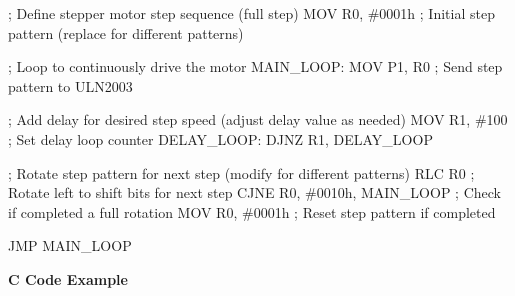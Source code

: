 \documentclass[
]{article}
\newenvironment{Shaded}{}{}
\newcommand{\NormalTok}[1]{#1}
\begin{document}
\begin{Shaded}
\begin{Highlighting}[]
\NormalTok{; Define stepper motor step sequence (full step)}
\NormalTok{MOV R0, \#0001h  ; Initial step pattern (replace for different patterns)}

\NormalTok{; Loop to continuously drive the motor}
\NormalTok{MAIN\_LOOP:}
\NormalTok{    MOV P1, R0     ; Send step pattern to ULN2003}

\NormalTok{    ; Add delay for desired step speed (adjust delay value as needed)}
\NormalTok{    MOV R1, \#100  ; Set delay loop counter}
\NormalTok{    DELAY\_LOOP:}
\NormalTok{        DJNZ R1, DELAY\_LOOP}

\NormalTok{    ; Rotate step pattern for next step (modify for different patterns)}
\NormalTok{    RLC R0        ; Rotate left to shift bits for next step}
\NormalTok{    CJNE R0, \#0010h, MAIN\_LOOP  ; Check if completed a full rotation}
\NormalTok{    MOV R0, \#0001h              ; Reset step pattern if completed}

\NormalTok{JMP MAIN\_LOOP}
\end{Highlighting}
\end{Shaded}

\textbf{C Code Example}
\end{document}
